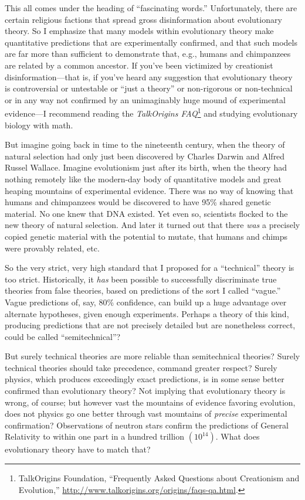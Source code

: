 {
 This all comes under the heading of ``fascinating
words.'' Unfortunately, there are certain religious
factions that spread gross disinformation about evolutionary theory. So
I emphasize that many models within evolutionary theory make
quantitative predictions that are experimentally confirmed, and that
such models are far more than sufficient to demonstrate that, e.g.,
humans and chimpanzees are related by a common ancestor. If
you've been victimized by creationist
disinformation---that is, if you've heard any
suggestion that evolutionary theory is controversial or untestable or
``just a theory'' or non-rigorous or
non-technical or in any way not confirmed by an unimaginably huge mound
of experimental evidence---I recommend reading the \textit{TalkOrigins
FAQ}\footnote{TalkOrigins Foundation, ``Frequently Asked
Questions about Creationism and Evolution,''
\url{http://www.talkorigins.org/origins/faqs-qa.html}.} and studying evolutionary biology with math.}

{
 But imagine going back in time to the nineteenth century, when the
theory of natural selection had only just been discovered by Charles
Darwin and Alfred Russel Wallace. Imagine evolutionism just after its
birth, when the theory had nothing remotely like the modern-day body of
quantitative models and great heaping mountains of experimental
evidence. There was no way of knowing that humans and chimpanzees would
be discovered to have 95\% shared genetic material. No one knew that
DNA existed. Yet even so, scientists flocked to the new theory of
natural selection. And later it turned out that there \textit{was} a
precisely copied genetic material with the potential to mutate, that
humans and chimps were provably related, etc.}

{
 So the very strict, very high standard that I proposed for a
``technical'' theory is too strict.
Historically, it \textit{has} been possible to successfully
discriminate true theories from false theories, based on predictions of
the sort I called ``vague.'' Vague
predictions of, say, 80\% confidence, can build up a huge advantage
over alternate hypotheses, given enough experiments. Perhaps a theory
of this kind, producing predictions that are not precisely detailed but
are nonetheless correct, could be called
``semitechnical''?}

{
 But surely technical theories are more reliable than semitechnical
theories? Surely technical theories should take precedence, command
greater respect? Surely physics, which produces exceedingly exact
predictions, is in some sense better confirmed than evolutionary
theory? Not implying that evolutionary theory is wrong, of course; but
however vast the mountains of evidence favoring evolution, does not
physics go one better through vast mountains of \textit{precise}
experimental confirmation? Observations of neutron stars confirm the
predictions of General Relativity to within one part in a hundred
trillion $(10^{14})$. What does evolutionary theory have
to match that?}

